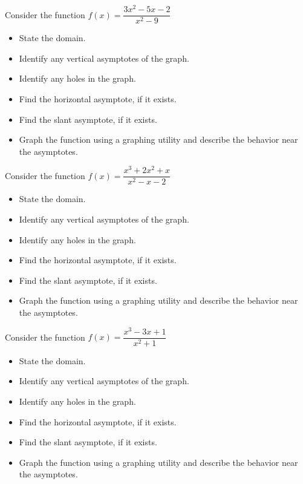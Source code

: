 \documentclass{ximera}
\begin{document}
\begin{problem}
Consider the function $f(x) = \dfrac{3x^2-5x-2}{x^2-9}$
\begin{itemize}
\item State the domain.
\item Identify any vertical asymptotes of the graph.
\item Identify any holes in the graph.
\item Find the horizontal asymptote, if it exists.
\item Find the slant asymptote, if it exists.
\item Graph the function using a graphing utility and describe the behavior near the asymptotes.
\end{itemize}
\end{problem} 

\begin{problem}
Consider the function $f(x) = \dfrac{x^3+2x^2+x}{x^2-x-2}$
\begin{itemize}
\item State the domain.
\item Identify any vertical asymptotes of the graph.
\item Identify any holes in the graph.
\item Find the horizontal asymptote, if it exists.
\item Find the slant asymptote, if it exists.
\item Graph the function using a graphing utility and describe the behavior near the asymptotes.
\end{itemize}
\end{problem} 

\begin{problem}
Consider the function $f(x) = \dfrac{x^{3} - 3x + 1}{x^{2} + 1}$
\begin{itemize}
\item State the domain.
\item Identify any vertical asymptotes of the graph.
\item Identify any holes in the graph.
\item Find the horizontal asymptote, if it exists.
\item Find the slant asymptote, if it exists.
\item Graph the function using a graphing utility and describe the behavior near the asymptotes.
\end{itemize}
\end{problem} 
\end{document}
